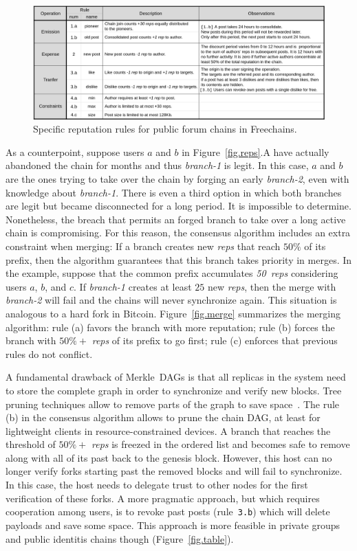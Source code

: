 \documentclass[10pt,journal,compsoc]{IEEEtran}
\newcommand{\FC}       {Freechains\xspace}
\newcommand{\reps}     {\emph{reps}\xspace}
\newcommand{\nreps}[1] {\emph{#1~reps\xspace}}
\begin{document}
\begin{figure}
\centering
\includegraphics[width=\textwidth]{rules.png}
\caption{Specific reputation rules for public forum chains in \FC.}
\label{fig.rules}
\end{figure}

As a counterpoint, suppose users $a$ and $b$ in Figure~\ref{fig.reps}.A have
actually abandoned the chain for months and thus \emph{branch-1} is legit.
In this case, $a$ and $b$ are the ones trying to take over the chain by
forging an early \emph{branch-2}, even with knowledge about \emph{branch-1}.
There is even a third option in which both branches are legit but became
disconnected for a long period.
It is impossible to determine.
Nonetheless, the breach that permits an forged branch to take over a long
active chain is compromising.
For this reason, the consensus algorithm includes an extra constraint when
merging:
If a branch creates new \reps that reach $50\%$ of its prefix, then the
algorithm guarantees that this branch takes priority in merges.
In the example, suppose that the common prefix accumulates \nreps{50}
considering users $a$, $b$, and $c$.
If \emph{branch-1} creates at least $25$ new \reps, then the merge with
\emph{branch-2} will fail and the chains will never synchronize again.
This situation is analogous to a hard fork in Bitcoin.
%
Figure~\ref{fig.merge} summarizes the merging algorithm:
    rule (a) favors the branch with more reputation;
    rule (b) forces the branch with $50\%+$ \reps of its prefix to go first;
    rule (c) enforces that previous rules do not conflict.

A fundamental drawback of Merkle~DAGs is that all replicas in the system need
to store the complete graph in order to synchronize and verify new blocks.
Tree pruning techniques allow to remove parts of the graph to save
space~\cite{p2p.prune}.
The rule (b) in the consensus algorithm allows to prune the chain DAG, at least
for lightweight clients in resource-constrained devices.
A branch that reaches the threshold of $50\%+$ \reps is freezed in the ordered
list and becomes safe to remove along with all of its past back to the genesis
block.
However, this host can no longer verify forks starting past the removed blocks
and will fail to synchronize.
In this case, the host needs to delegate trust to other nodes for the first
verification of these forks.
A more pragmatic approach, but which requires cooperation among users, is to
revoke past posts (rule~\texttt{3.b}) which will delete payloads and save some
space.
This approach is more feasible in private groups and public identitis chains
though (Figure~\ref{fig.table}).
\end{document}
